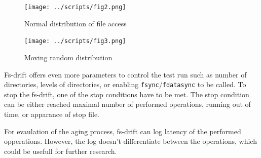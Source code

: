 \documentclass[
  color, %
  table, %
  lof,   %
  lot,   %
]{fithesis3}
\begin{document}
\begin{figure}[!htb]
    \begin{minipage}{\textwidth}
        \centering
        \texttt{[image: ../scripts/fig2.png]}
        \caption{Normal distribution of file access}

\label{fig:rand2}
    \end{minipage}

\end{figure}
\begin{figure}
    \begin{minipage}{\textwidth}
        \centering
        \texttt{[image: ../scripts/fig3.png]}
        \caption{Moving random distribution}
\label{fig:rand3}
    \end{minipage}
\end{figure}



Fs-drift offers even more parameters to control the test run such as number of directories, levels of directories, or enabling \texttt{fsync}/\texttt{fdatasync} to be called. To stop the fs-drift, one of the stop conditions have to be met. The stop condition can be either reached maximal number of performed operations, running out of time, or apparance of stop file.

For evaulation of the aging process, fs-drift can log latency of the performed opperations. However, the log doesn't differentiate between the operations, which could be usefull for further research.
\end{document}
